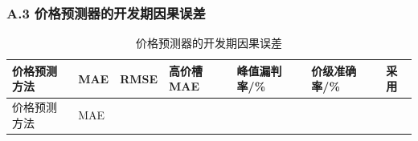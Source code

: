 \documentclass[zihao=-4,a4paper,UTF8,fontset=none]{ctexart}
\begin{document}
\endgroup

\par\pagebreak[2]\subsubsection*{A.3 价格预测器的开发期因果误差}

\begingroup\renewcommand{\tablename}{附表}\renewcommand{\thetable}{A-3}

\begin{longtable}[]{@{}
  >{\centering\arraybackslash}p{}
  >{\centering\arraybackslash}p{}
  >{\centering\arraybackslash}p{}
  >{\centering\arraybackslash}p{}
  >{\centering\arraybackslash}p{}
  >{\centering\arraybackslash}p{}
  >{\centering\arraybackslash}p{}@{}}
\caption{价格预测器的开发期因果误差}\label{tab:appendix-A-3}\tabularnewline
\toprule\noalign{}
\begin{minipage}[b]{\linewidth}\centering
价格预测方法
\end{minipage} & \begin{minipage}[b]{\linewidth}\centering
MAE
\end{minipage} & \begin{minipage}[b]{\linewidth}\centering
RMSE
\end{minipage} & \begin{minipage}[b]{\linewidth}\centering
高价槽MAE
\end{minipage} & \begin{minipage}[b]{\linewidth}\centering
峰值漏判率/\%
\end{minipage} & \begin{minipage}[b]{\linewidth}\centering
价级准确率/\%
\end{minipage} & \begin{minipage}[b]{\linewidth}\centering
采用
\end{minipage} \\
\midrule\noalign{}
\endfirsthead
\toprule\noalign{}
\begin{minipage}[b]{\linewidth}\centering
价格预测方法
\end{minipage} & \begin{minipage}[b]{\linewidth}\centering
MAE
\end{minipage} & \begin{minipage}[b]{\linewidth}\centering

\end{minipage}
\end{longtable}
\end{document}
